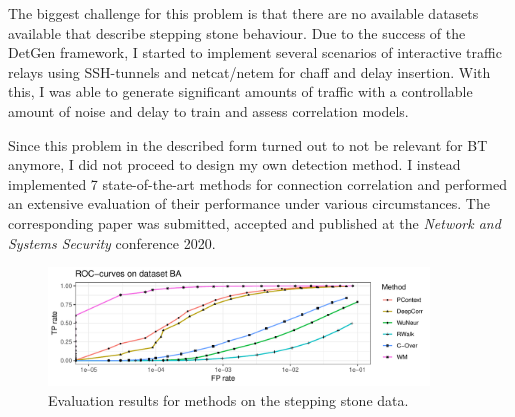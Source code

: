 \documentclass[a4paper,12pt,twoside]{article}
\begin{document}
The biggest challenge for this problem is that there are no available datasets available that describe stepping stone behaviour. Due to the success of the  DetGen framework, I started to implement several scenarios of interactive traffic relays using SSH-tunnels and netcat/netem for chaff and delay insertion. With this, I was able to generate significant amounts of traffic with a controllable amount of noise and delay to train and assess correlation models.

Since this problem in the described form turned out to not be relevant for BT anymore, I did not proceed to design my own detection method. 
I instead implemented 7 state-of-the-art methods for connection correlation and performed an extensive evaluation of their performance under various circumstances. The corresponding paper was submitted, accepted and published at the \textit{Network and Systems Security} conference 2020.


\begin{figure}
\centering
\includegraphics[width=0.9\textwidth]{images/Noevasion_4nodes-1.pdf}
\caption{Evaluation results for methods on the stepping stone data.}\label{stepstone}
\end{figure}


\end{document}
